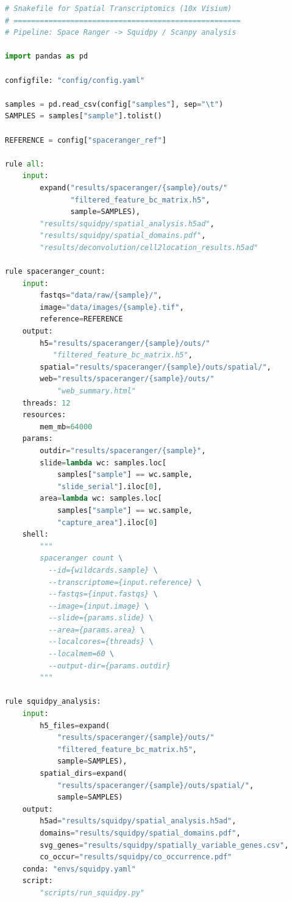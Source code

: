 \begin{lstlisting}[language=Python, caption={Snakemake workflow for 10x Visium
spatial transcriptomics analysis.}, label={lst:spatial:snakemake}]
# Snakefile for Spatial Transcriptomics (10x Visium)
# ====================================================
# Pipeline: Space Ranger -> Squidpy / Scanpy analysis

import pandas as pd

configfile: "config/config.yaml"

samples = pd.read_csv(config["samples"], sep="\t")
SAMPLES = samples["sample"].tolist()

REFERENCE = config["spaceranger_ref"]

rule all:
    input:
        expand("results/spaceranger/{sample}/outs/"
               "filtered_feature_bc_matrix.h5",
               sample=SAMPLES),
        "results/squidpy/spatial_analysis.h5ad",
        "results/squidpy/spatial_domains.pdf",
        "results/deconvolution/cell2location_results.h5ad"

rule spaceranger_count:
    input:
        fastqs="data/raw/{sample}/",
        image="data/images/{sample}.tif",
        reference=REFERENCE
    output:
        h5="results/spaceranger/{sample}/outs/"
           "filtered_feature_bc_matrix.h5",
        spatial="results/spaceranger/{sample}/outs/spatial/",
        web="results/spaceranger/{sample}/outs/"
            "web_summary.html"
    threads: 12
    resources:
        mem_mb=64000
    params:
        outdir="results/spaceranger/{sample}",
        slide=lambda wc: samples.loc[
            samples["sample"] == wc.sample,
            "slide_serial"].iloc[0],
        area=lambda wc: samples.loc[
            samples["sample"] == wc.sample,
            "capture_area"].iloc[0]
    shell:
        """
        spaceranger count \
          --id={wildcards.sample} \
          --transcriptome={input.reference} \
          --fastqs={input.fastqs} \
          --image={input.image} \
          --slide={params.slide} \
          --area={params.area} \
          --localcores={threads} \
          --localmem=60 \
          --output-dir={params.outdir}
        """

rule squidpy_analysis:
    input:
        h5_files=expand(
            "results/spaceranger/{sample}/outs/"
            "filtered_feature_bc_matrix.h5",
            sample=SAMPLES),
        spatial_dirs=expand(
            "results/spaceranger/{sample}/outs/spatial/",
            sample=SAMPLES)
    output:
        h5ad="results/squidpy/spatial_analysis.h5ad",
        domains="results/squidpy/spatial_domains.pdf",
        svg_genes="results/squidpy/spatially_variable_genes.csv",
        co_occur="results/squidpy/co_occurrence.pdf"
    conda: "envs/squidpy.yaml"
    script:
        "scripts/run_squidpy.py"


\end{lstlisting}
